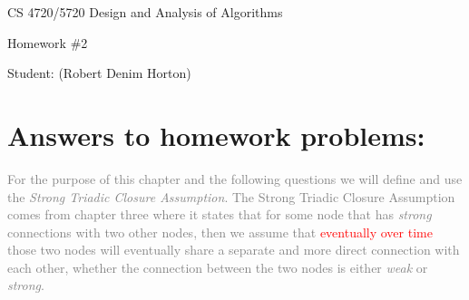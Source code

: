 \documentclass[11pt]{article}
\begin{document}
 

\rhead{\today}

\begin{center}\begin{Large}
CS 4720/5720 Design and Analysis of Algorithms

Homework \#2

Student: (Robert Denim Horton)
\end{Large}
\end{center}


\section*{Answers to homework problems:}
\textcolor{gray}{
For the purpose of this chapter and the following questions we will define and use the \textit{Strong Triadic Closure Assumption}.  The Strong Triadic Closure Assumption comes from chapter three where it states that for some node that has \textit{strong} connections with two other nodes, then  we assume that \textcolor{red}{eventually over time} those two nodes will eventually share a separate and more direct connection with each other, whether the connection between the two nodes is either \textit{weak} or \textit{strong}.\\\\
}
\end{document}

